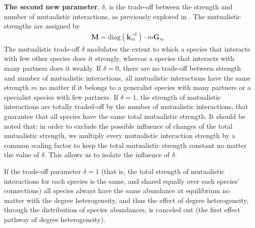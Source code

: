\documentclass[a4paper,fleqn,12pt]{article}
\begin{document}
\textbf{The second new parameter}, $\delta$, is the trade-off between the strength and number of mutualistic interactions, as previously explored in \cite{lever_sudden_2014,rohr_structural_2014,dakos_critical_2014,saavedra_nested_2016,saavedra_estimating_2013}.
The mutualistic strengths are assigned by
\begin{align} \label{eq:degree-hetero-tradeoff}
 \mathbf{M} = \textrm{diag}(\mathbf{k}_m^{-\delta}) \cdot m\mathbf{G}_m
\end{align}
The mutualistic trade-off $\delta$ modulates the extent to which a species that interacts with few other species does it strongly, whereas a species that interacts with many partners does it weakly.
If $\delta = 0$, there are no trade-off between strength and number of mutualistic interactions, all mutualistic interactions have the same strength $m$ no matter if it belongs to a generalist species with many partners or a specialist species with few partners.
If $\delta = 1$, the strength of mutualistic interactions are totally traded-off by the number of mutualistic interactions, that guarantee that all species have the same total mutualistic strength.
It should be noted that: 
in order to exclude the possible influence of changes of the total mutualistic strength,
we multiply every mutualistic interaction strength by a common scaling factor to keep the total mutualistic strength constant no matter the value of $\delta$.
This allows us to isolate the influence of $\delta$.

If the trade-off parameter $\delta = 1$ (that is, the total strength of mutualistic interactions for each species is the same, and shared equally over each species' connections) all species always have the same abundance at equilibrium no matter with the degree heterogeneity,
and thus the effect of degree heterogeneity, through the distribution of species abundances, is canceled out (the first effect pathway of degree heterogeneity).
\end{document}
